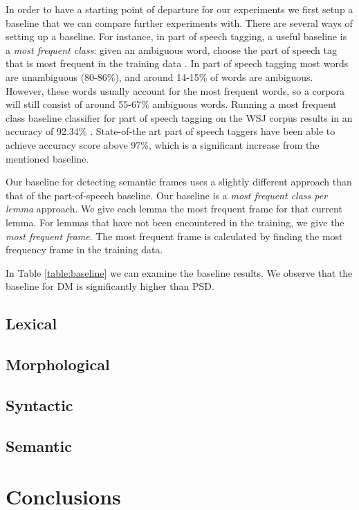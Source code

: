 In order to have a starting point of departure for our experiments we first setup a baseline that we can compare further experiments with. There are several ways of setting up a baseline. For instance, in part of speech tagging, a useful baseline is a \textit{most frequent class}: given an ambiguous word, choose the part of speech tag that is most frequent in the training data \cite{Jur:Mar:09}. In part of speech tagging most words are unambiguous (80-86\%), and around 14-15\% of words are ambiguous. However, these words usually account for the most frequent words, so a corpora will still consist of around 55-67\% ambiguous words. Running a most frequent class baseline classifier for part of speech tagging on the WSJ corpus results in an accuracy of 92.34\% \cite{Jur:Mar:09}. State-of-the art part of speech taggers have been able to achieve accuracy score above 97\%, which is a significant increase from the mentioned baseline.

Our baseline for detecting semantic frames uses a slightly different approach than that of the part-of-speech baseline. Our baseline is a \textit{most frequent class per lemma} approach. We give each lemma the most frequent frame for that current lemma. For lemmas that have not been encountered in the training, we give the \textit{most frequent frame}. The most frequent frame is calculated by finding the most frequency frame in the training data. 

In Table \ref{table:baseline} we can examine the baseline results. We observe that the baseline for DM is significantly higher than PSD. 

\subsection{Lexical}

\subsection{Morphological}

\subsection{Syntactic}

\subsection{Semantic}

\section{Conclusions}